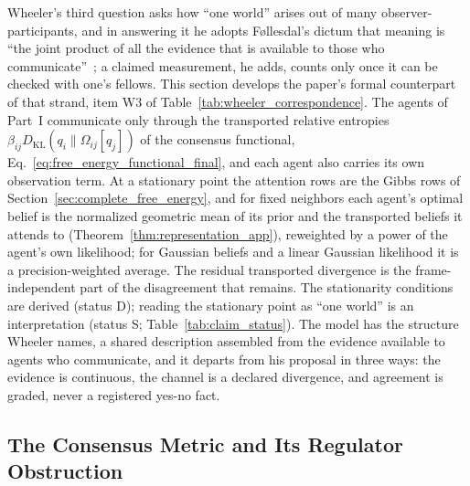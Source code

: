 \documentclass[11pt]{article}
\begin{document}
Wheeler's third question asks how ``one world'' arises out of many observer-participants, and in answering it he adopts F{\o}llesdal's dictum that meaning is ``the joint product of all the evidence that is available to those who communicate''~\cite{Wheeler1990}; a claimed measurement, he adds, counts only once it can be checked with one's fellows. This section develops the paper's formal counterpart of that strand, item W3 of Table~\ref{tab:wheeler_correspondence}. The agents of Part~I communicate only through the transported relative entropies $\beta_{ij} D_{\mathrm{KL}}(q_i \| \Omega_{ij}[q_j])$ of the consensus functional, Eq.~\eqref{eq:free_energy_functional_final}, and each agent also carries its own observation term. At a stationary point the attention rows are the Gibbs rows of Section~\ref{sec:complete_free_energy}, and for fixed neighbors each agent's optimal belief is the normalized geometric mean of its prior and the transported beliefs it attends to (Theorem~\ref{thm:representation_app}), reweighted by a power of the agent's own likelihood; for Gaussian beliefs and a linear Gaussian likelihood it is a precision-weighted average. The residual transported divergence is the frame-independent part of the disagreement that remains. The stationarity conditions are derived (status D); reading the stationary point as ``one world'' is an interpretation (status S; Table~\ref{tab:claim_status}). The model has the structure Wheeler names, a shared description assembled from the evidence available to agents who communicate, and it departs from his proposal in three ways: the evidence is continuous, the channel is a declared divergence, and agreement is graded, never a registered yes-no fact.

\subsection{The Consensus Metric and Its Regulator Obstruction}
\label{sec:consensus_metric}
\end{document}
